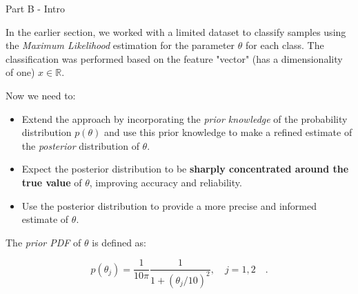 \documentclass[aspectratio=169,xcolor=dvipsnames]{beamer}
\begin{document}
\begin{frame}{Part B - Intro}

    In the earlier section, we worked with a limited dataset to classify samples using the \textit{Maximum Likelihood} estimation for the parameter $\theta$ for each class. The classification was performed based on the feature "vector" (has a dimensionality of one) $x \in \mathbb{R}$. 

    Now we need to:

    \vspace{-5pt}

    \begin{itemize}
        \item Extend the approach by incorporating the \textit{prior knowledge} of the probability distribution $p(\theta)$ and use this prior knowledge to make a refined estimate of the \textit{posterior} distribution of $\theta$.
        \item Expect the posterior distribution to be \textbf{sharply concentrated around the true value} of $\theta$, improving accuracy and reliability.
        \item Use the posterior distribution to provide a more precise and informed estimate of $\theta$.
    \end{itemize}
    
    The \textit{prior PDF} of $\theta$ is defined as:  

    $$ p(\theta_j) = \frac{1}{10\pi} \frac{1}{1 + (\theta_j / 10)^2}, \quad j = 1, 2 \quad.$$

\end{frame}

\end{document}
